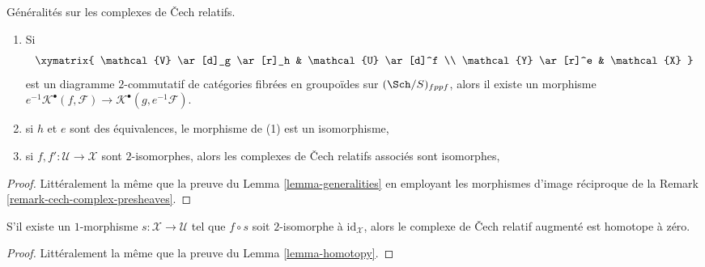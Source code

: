 \begin{lemma}
\label{lemma-generalities-sheafified}
Généralités sur les complexes de {\v C}ech relatifs.
\begin{enumerate}
\item Si
$$
\xymatrix{
\mathcal{V} \ar[d]_g \ar[r]_h & \mathcal{U} \ar[d]^f \\
\mathcal{Y} \ar[r]^e & \mathcal{X}
}
$$
est un diagramme $2$-commutatif de catégories fibrées en groupoïdes sur
$(\Sch/S)_{fppf}$, alors il existe un morphisme
$e^{-1}\mathcal{K}^\bullet(f, \mathcal{F}) \to
\mathcal{K}^\bullet(g, e^{-1}\mathcal{F})$.
\item si $h$ et $e$ sont des équivalences, le morphisme de (1) est un isomorphisme,
\item si $f, f' : \mathcal{U} \to \mathcal{X}$ sont $2$-isomorphes, alors
les complexes de {\v C}ech relatifs associés sont isomorphes,
\end{enumerate}
\end{lemma}

\begin{proof}
Littéralement la même que la preuve du
Lemma \ref{lemma-generalities}
en employant les morphismes d'image réciproque de la
Remark \ref{remark-cech-complex-presheaves}.
\end{proof}

\begin{lemma}
\label{lemma-homotopy-sheafified}
S'il existe un $1$-morphisme $s : \mathcal{X} \to \mathcal{U}$
tel que $f \circ s$ soit $2$-isomorphe à $\text{id}_\mathcal{X}$,
alors le complexe de {\v C}ech relatif augmenté est homotope à zéro.
\end{lemma}

\begin{proof}
Littéralement la même que la preuve du
Lemma \ref{lemma-homotopy}.
\end{proof}

